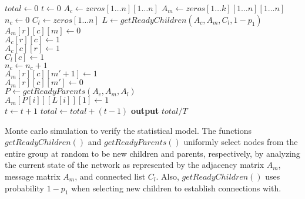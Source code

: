 \documentclass[12pt]{article}
\begin{document}
\begin{algorithm}[H] \label{alg:simulation}
\tiny
  \SetAlgoLined
    $total \gets 0$\;
	 {
    	$t \gets 0$\;
      $A_c \gets zeros[1\dots n][1\dots n]$\;
      $A_m \gets zeros[1\dots k][1\dots n][1\dots n]$\;
      $n_c \gets 0$\;
      $C_l \gets zeros[1\dots n]$\;
    	 {
        	$L \gets getReadyChildren(A_c, A_m, C_l, 1-p_1)\;$\\
           {
             {
               {
                $A_m[r][c][m] \gets 0\;$ \\
                $A_c[r][c] \gets 1\;$ \\
                $A_c[c][r] \gets 1\;$ \\
                $C_l[c] \gets 1\;$ \\
                $n_c \gets n_c + 1\;$\\
              }
            }
          }
           {
             {
               {
                 {
                  $A_m[r][c][m' + 1] \gets 1\;$ \\
                  $A_m[r][c][m'] \gets 0\;$ \\
                }
              }
            }
          }
          $P \gets getReadyParents(A_c, A_m, A_l)\;$\\
           {
            $A_m[P[i]][L[i]][1] \gets 1\;$ \\
          }
          $t \gets t + 1$\;
        }
         $total \gets total + (t - 1)$\;
      }
    \textbf{output} $total / T$
  \caption{Monte carlo simulation to verify the statistical model. The functions $getReadyChildren()$ and $getReadyParents()$ uniformly select nodes from the entire group at random to be new children and parents, respectively, by analyzing the current state of the network as represented by the adjacency matrix $A_m$, message matrix $A_m$, and connected list $C_l$. Also, $getReadyChildren()$ uses probability $1- p_1$ when selecting new children to establish connections with.}
\end{algorithm}
\end{document}
